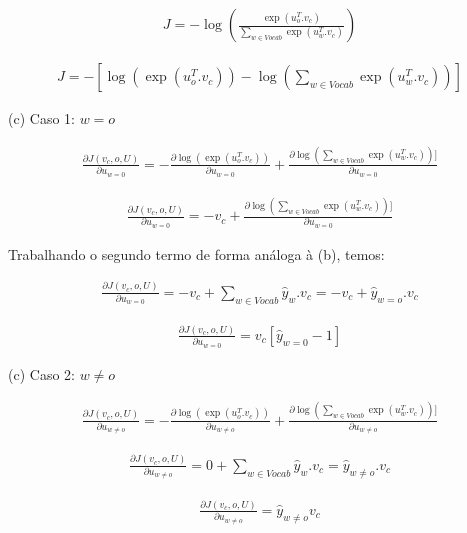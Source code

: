 \documentclass[a4paper,12pt]{article}
\begin{document}
\noindent

\begin{align}
J = - \log( \frac{ \exp( u_o^T . v_c ) }{ \sum_{w \in Vocab} \exp(  u_w^T . v_c ) } )
\end{align}

\begin{align}
J = - [\log( \exp( u_o^T . v_c )) - \log( \sum_{w \in Vocab} \exp(  u_w^T . v_c )  )]
\end{align}


(c) Caso 1: $w = o$

\begin{align*}
\frac{\partial J(v_c, o, U) }{\partial u_{w = 0}} = - \frac{ \partial \log( \exp( u_o^T . v_c ))}{  \partial u_{w = 0}} + \frac{ \partial \log( \sum_{w \in Vocab} \exp(  u_w^T . v_c )  )]}{  \partial u_{w = 0}}
\end{align*}

\begin{align}\label{q_dezen}
\frac{\partial J(v_c, o, U) }{\partial u_{w = 0}} = - v_c + \frac{ \partial \log( \sum_{w \in Vocab} \exp(  u_w^T . v_c )  )]}{  \partial u_{w = 0}} 
\end{align}

Trabalhando o segundo termo de forma análoga à (b), temos:

\begin{align*}
\frac{\partial J(v_c, o, U) }{\partial u_{w = 0}} = - v_c + \sum_{w \in Vocab} \hat{y}_{w} . v_c  = - v_c + \hat{y}_{w=o} . v_c
\end{align*}


\begin{align}
\frac{\partial J(v_c, o, U) }{\partial u_{w = 0}} = v_c [\hat{y}_{w=0} -1] 
\end{align}

(c) Caso 2: $w \neq o$

\begin{align}
\frac{\partial J(v_c, o, U) }{\partial u_{w \neq o}} = - \frac{ \partial \log( \exp( u_o^T . v_c ))}{  \partial u_{w \neq o}} + \frac{ \partial \log( \sum_{w \in Vocab} \exp(  u_w^T . v_c )  )]}{  \partial u_{w \neq o}}
\end{align}

\begin{align*}
\frac{\partial J(v_c, o, U) }{\partial u_{w \neq o}} = 0 + \sum_{w \in Vocab} \hat{y}_{w} . v_c  = \hat{y}_{w \neq o} . v_c
\end{align*}




\begin{align}
\frac{\partial J(v_c, o, U) }{\partial u_{w \neq o}} = \hat{y}_{w \neq o} v_c
\end{align}
\end{document}
